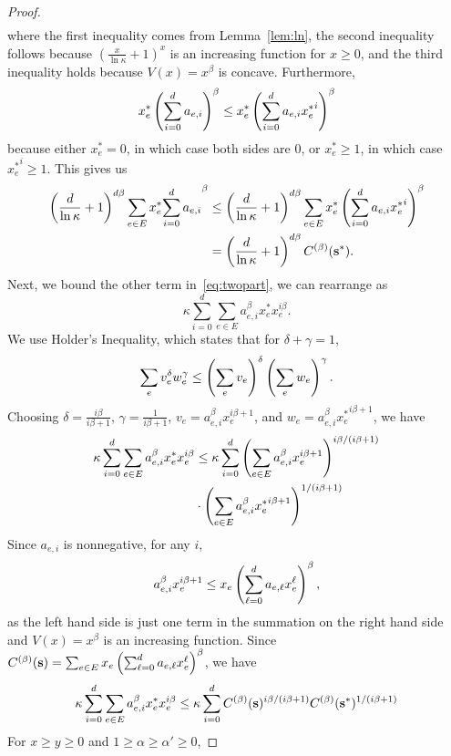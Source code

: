 \documentclass[twoside]{article}
\begin{document}
\begin{multicols}{2}
\begin{proof}
\begin{align*}
  \end{align*}
  where the first inequality comes from Lemma~\ref{lem:ln}, the second inequality
  follows because $(\frac{x}{\ln \kappa} + 1)^x$ is an increasing function for
  $x \ge 0$, and the third inequality holds because $V(x) = x^\beta$ is concave.
  Furthermore,
  \[
    x_e^* \left(\sum_{i=0}^d a_{e,i}\right)^\beta \le x_e^* \left(\sum_{i=0}^d a_{e,i}
    {x_e^*}^i\right)^\beta
  \]
  because either $x_e^* = 0$, in which case both sides are 0, or $x_e^* \ge 1$,
  in which case ${x_e^*}^i \ge 1$. This gives us
  \begin{align*}
    \left(\frac{d}{\ln \kappa} + 1\right)^{d\beta} \sum_{e \in E} x_e^* {\sum_{i=0}^d
    a_{e,i}}^\beta &\le \left(\frac{d}{\ln \kappa} + 1\right)^{d\beta} \sum_{e \in E}
    x_e^* \left(\sum_{i=0}^d a_{e,i}
    {x_e^*}^i\right)^\beta \\
    &= \left(\frac{d}{\ln \kappa} + 1\right)^{d\beta} C^{(\beta)}(\mathbf{s}^*).
  \end{align*}
  Next, we bound the other term in~\eqref{eq:twopart}, we can rearrange as
  \[
    \kappa\sum_{i=0}^d \sum_{e \in E} a_{e,i}^\beta x_e^* x_e^{i\beta}.
  \]
  We use Holder's Inequality, which states that for $\delta + \gamma = 1$,
  \[
    \sum_e v_e^\delta w_e^\gamma \le \left(\sum_e v_e\right)^\delta \left(\sum_e w_e\right)^\gamma.
  \]
  Choosing $\delta = \frac{i\beta}{i\beta + 1}$, $\gamma = \frac{1}{i\beta +
  1}$, $v_e = a_{e,i}^\beta x_e^{i\beta + 1}$, and $w_e = a_{e,i}^\beta
  {x_e^*}^{i\beta + 1}$, we have
  \begin{align*}
    \kappa\sum_{i=0}^d \sum_{e \in E} a_{e,i}^\beta x_e^* x_e^{i\beta} &\le
    \kappa \sum_{i=0}^d \left(\sum_{e \in E} a_{e,i}^\beta x_e^{i\beta +
    1}\right)^{i\beta/(i\beta+1)} \\
    &\cdot \left(\sum_{e \in E} a_{e,i}^\beta {x_e^*}^{i\beta +
    1}\right)^{1/(i\beta+1)}
  \end{align*}
  Since $a_{e,i}$ is nonnegative, for any $i$,
  \[
    a_{e,i}^\beta x_e^{i\beta+1} \le x_e \left(\sum_{\ell=0}^d a_{e,\ell}
    x_e^{\ell}\right)^\beta,
  \]
  as the left hand side is just one term in the summation on the right hand
  side and $V(x) = x^\beta$ is an increasing function. Since $C^{(\beta)}(\mathbf{s}) =
  \sum_{e \in E} x_e \left(\sum_{\ell=0}^d a_{e,\ell} x_e^\ell\right)^\beta$, we have
  \begin{align*}
    \kappa\sum_{i=0}^d \sum_{e \in E} a_{e,i}^\beta x_e^* x_e^{i\beta} &\le
    \kappa \sum_{i=0}^d C^{(\beta)}(\mathbf{s})^{i\beta/(i\beta+1)}
    C^{(\beta)}(\mathbf{s}^*)^{1/(i\beta+1)} \\
  \end{align*}
  For $x \ge y \ge 0$ and $1 \ge \alpha \ge \alpha' \ge 0$,

\end{proof}
\end{multicols}
\end{document}
